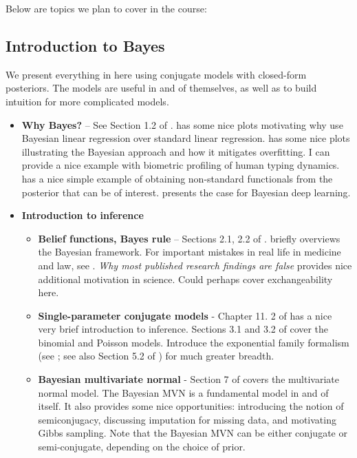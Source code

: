 \documentclass{article} %
\begin{document}
Below are topics we plan to cover in the course:

\subsection{Introduction to Bayes}

We present everything in here using conjugate models with closed-form posteriors.  The models are useful in and of themselves,  as well as to build intuition for more complicated models.   

\begin{itemize}
\item \textbf{Why Bayes?} -- See Section 1.2 of \cite{hoff2009first}.   \cite{bishop2006pattern} has some nice plots motivating why use Bayesian linear regression over standard linear regression.   \cite{ghahramani2013bayesian}  has some nice plots illustrating the Bayesian approach and how it mitigates overfitting.   I can provide a nice example with biometric profiling of human typing dynamics.   \cite{held2006bayesian} has a nice simple example of obtaining non-standard functionals from the posterior that can be of interest.   \cite{wilson2020case} presents the case for Bayesian deep learning.  
\item \textbf{Introduction to inference} 
	\begin{itemize}
	\item \textbf{Belief functions,  Bayes rule} -- Sections 2.1,  2.2 of \cite{hoff2009first}.   \cite{ghahramani2013bayesian} briefly overviews the Bayesian framework.   For important mistakes in real life in medicine and law,  see \cite{guardianXXXXobscure}.  \textit{Why most published research findings are false} \cite{ioannidis2005most} provides nice additional motivation in science.    Could perhaps cover exchangeability here. 
	\item \textbf{Single-parameter conjugate models} - Chapter 11. 2 of \cite{davison2003statistical} has a nice very brief introduction to inference.      Sections 3.1 and 3.2 of \cite{hoff2009first} cover the  binomial and Poisson models.   Introduce the exponential family formalism (see \cite{wojnowiczXXXXexponential};  see also Section 5.2 of \cite{davison2003statistical} ) for much greater breadth.  
	\item \textbf{Bayesian multivariate normal} -  Section 7 of \cite{hoff2009first} covers the  multivariate normal model.  The Bayesian MVN is a fundamental model in and of itself.  It also provides some nice opportunities: introducing the notion of semiconjugacy,  discussing imputation for missing data, and motivating Gibbs sampling.   Note that the Bayesian MVN can be either conjugate or semi-conjugate,  depending on the choice of prior.
	\end{itemize}   

\end{itemize}
\end{document}
